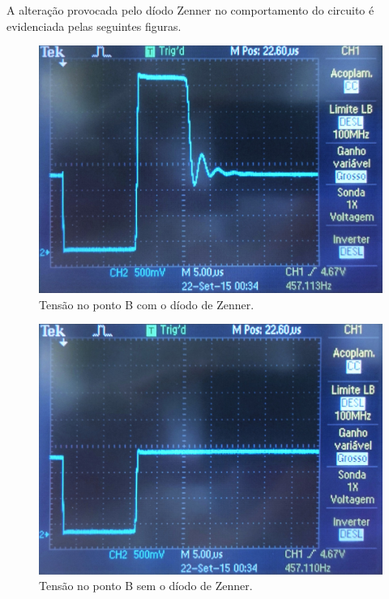 \documentclass[a4paper,11pt]{article}
\numberwithin{equation}{section}
\begin{document}
A alteração provocada pelo díodo Zenner no comportamento do circuito é evidenciada pelas seguintes figuras.

\begin{figure}[h]
	\centering
	\includegraphics[keepaspectratio=true, scale=0.14]{img/DSC0118}
	\caption{Tensão no ponto B com o díodo de Zenner.}
	\label{fig:photo 2}
	\vspace{-0.8em}
\end{figure}

\begin{figure}[h]
	\centering
	\includegraphics[keepaspectratio=true, scale=0.14]{img/DSC0119}
	\caption{Tensão no ponto B sem o díodo de Zenner.}
	\label{fig:photo 3}
	\vspace{-0.8em}
\end{figure}
\end{document}
